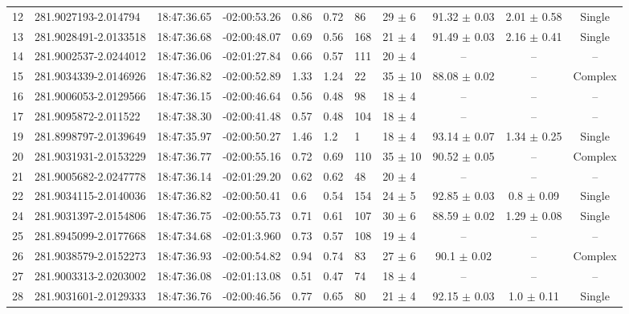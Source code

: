 \documentclass[longauth]{aa} %
\begin{document}
\begin{appendix}
\begin{table}[htp]
\begin{tabular}{llllllllccc}
12  &  281.9027193-2.014794  &  18:47:36.65  &  -02:00:53.26  &  0.86  &  0.72  &  86  &  29 $\pm$ 6  &  91.32 $\pm$ 0.03  &  2.01 $\pm$ 0.58  &  Single \\
13  &  281.9028491-2.0133518  &  18:47:36.68  &  -02:00:48.07  &  0.69  &  0.56  &  168  &  21 $\pm$ 4  &  91.49 $\pm$ 0.03  &  2.16 $\pm$ 0.41  &  Single \\
14  &  281.9002537-2.0244012  &  18:47:36.06  &  -02:01:27.84  &  0.66  &  0.57  &  111  &  20 $\pm$ 4  &  --  &  --  &  -- \\
15  &  281.9034339-2.0146926  &  18:47:36.82  &  -02:00:52.89  &  1.33  &  1.24  &  22  &  35 $\pm$ 10  &  88.08 $\pm$ 0.02  &  --  &  Complex \\
16  &  281.9006053-2.0129566  &  18:47:36.15  &  -02:00:46.64  &  0.56  &  0.48  &  98  &  18 $\pm$ 4  &  --  &  --  &  -- \\
17  &  281.9095872-2.011522  &  18:47:38.30  &  -02:00:41.48  &  0.57  &  0.48  &  104  &  18 $\pm$ 4  &  --  &  --  &  -- \\
19  &  281.8998797-2.0139649  &  18:47:35.97  &  -02:00:50.27  &  1.46  &  1.2  &  1  &  18 $\pm$ 4  &  93.14 $\pm$ 0.07  &  1.34 $\pm$ 0.25  &  Single \\
20  &  281.9031931-2.0153229  &  18:47:36.77  &  -02:00:55.16  &  0.72  &  0.69  &  110  &  35 $\pm$ 10  &  90.52 $\pm$ 0.05  &  --  &  Complex \\
21  &  281.9005682-2.0247778  &  18:47:36.14  &  -02:01:29.20  &  0.62  &  0.62  &  48  &  20 $\pm$ 4  &  --  &  --  &  -- \\
22  &  281.9034115-2.0140036  &  18:47:36.82  &  -02:00:50.41  &  0.6  &  0.54  &  154  &  24 $\pm$ 5  &  92.85 $\pm$ 0.03  &  0.8 $\pm$ 0.09  &  Single \\
24  &  281.9031397-2.0154806  &  18:47:36.75  &  -02:00:55.73  &  0.71  &  0.61  &  107  &  30 $\pm$ 6  &  88.59 $\pm$ 0.02  &  1.29 $\pm$ 0.08  &  Single \\
25  &  281.8945099-2.0177668  &  18:47:34.68  &  -02:01:3.960  &  0.73  &  0.57  &  108  &  19 $\pm$ 4  &  --  &  --  &  -- \\
26  &  281.9038579-2.0152273  &  18:47:36.93  &  -02:00:54.82  &  0.94  &  0.74  &  83  &  27 $\pm$ 6  &  90.1 $\pm$ 0.02  &  --  &  Complex \\
27  &  281.9003313-2.0203002  &  18:47:36.08  &  -02:01:13.08  &  0.51  &  0.47  &  74  &  18 $\pm$ 4  &  --  &  --  &  -- \\
28  &  281.9031601-2.0129333  &  18:47:36.76  &  -02:00:46.56  &  0.77  &  0.65  &  80  &  21 $\pm$ 4  &  92.15 $\pm$ 0.03  &  1.0 $\pm$ 0.11  &  Single \\

\end{tabular}
\end{table}
\end{appendix}
\end{document}
